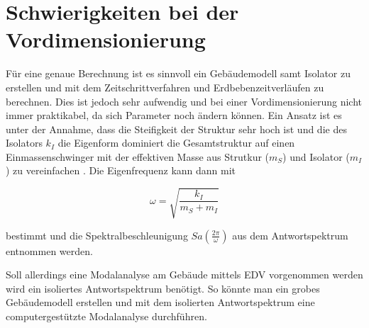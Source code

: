 \pagebreak

\section{Schwierigkeiten bei der Vordimensionierung}
\label{sec:schwierigkeitenvordimensionierung}

Für eine genaue Berechnung ist es sinnvoll ein Gebäudemodell samt Isolator zu erstellen und mit dem Zeitschrittverfahren und Erdbebenzeitverläufen zu berechnen. Dies ist jedoch sehr aufwendig und bei einer Vordimensionierung nicht immer praktikabel, da sich Parameter noch ändern können.
Ein Ansatz ist es unter der Annahme, dass die Steifigkeit der Struktur sehr hoch ist und die des Isolators $k_I$ die Eigenform dominiert die Gesamtstruktur auf einen Einmassenschwinger mit der effektiven Masse aus Strutkur ($m_S$) und Isolator ($m_I$) zu vereinfachen \cite{Kelly}.
Die Eigenfrequenz kann dann mit

\begin{equation}
\omega = \sqrt{\frac{k_I}{m_S + m_I}}
\end{equation}

bestimmt und die Spektralbeschleunigung $Sa(\frac{2 \pi}{\omega})$ aus dem Antwortspektrum entnommen werden.

Soll allerdings eine Modalanalyse am Gebäude mittels EDV vorgenommen werden wird ein isoliertes Antwortspektrum benötigt.
So könnte man ein grobes Gebäudemodell erstellen und mit dem isolierten Antwortspektrum eine computergestützte Modalanalyse durchführen.

\pagebreak
